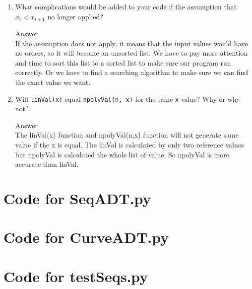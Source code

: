 \documentclass[12pt]{article}
\begin{document}
\begin{enumerate}
\item What complications would be added to your code if the assumption that
  $x_i < x_{i+1}$ no longer applied?

Answer
\\If the assumption does not apply, it means that the input values would have no orders, so it will become an unsorted list. We have to pay more attention and time to sort this list to a sorted list to make sure our program run correctly. Or we have to find a searching algorithm to make sure we can find the exact value we want. 
\item Will \texttt{linVal(x)} equal \texttt{npolyVal(n, x)} for the same \texttt{x}
  value?  Why or why not?

Answer
\\The linVal(x) function and npolyVal(n,x) function will not generate same value if the x is equal. The linVal is calculated by only two reference values but npolyVal is calculated the whole list of value. So npolyVal is more accurate than linVal.
\end{enumerate}

\newpage

\lstset{language=Python, basicstyle=\tiny, breaklines=true, showspaces=false,
  showstringspaces=false, breakatwhitespace=true}

\def\thesection{\Alph{section}} 

\section{Code for SeqADT.py}

\noindent 

\newpage

\section{Code for CurveADT.py}

\noindent 

\newpage

\section{Code for testSeqs.py}

\noindent 

\newpage
\end{document}
